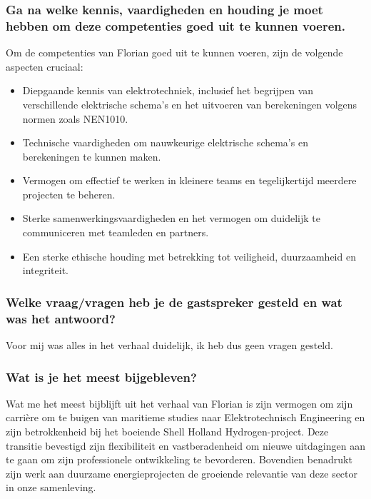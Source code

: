 \subsubsection{Ga na welke kennis, vaardigheden en houding je moet hebben om deze competenties goed uit te kunnen voeren.}
Om de competenties van Florian goed uit te kunnen voeren, zijn de volgende aspecten cruciaal:
\begin{itemize}
    \item Diepgaande kennis van elektrotechniek, inclusief het begrijpen van verschillende elektrische schema's en het uitvoeren van berekeningen volgens normen zoals NEN1010.
    \item Technische vaardigheden om nauwkeurige elektrische schema's en berekeningen te kunnen maken.
    \item Vermogen om effectief te werken in kleinere teams en tegelijkertijd meerdere projecten te beheren.
    \item Sterke samenwerkingsvaardigheden en het vermogen om duidelijk te communiceren met teamleden en partners.
    \item Een sterke ethische houding met betrekking tot veiligheid, duurzaamheid en integriteit.
\end{itemize}

\subsubsection{Welke vraag/vragen heb je de gastspreker gesteld en wat was het antwoord?}
Voor mij was alles in het verhaal duidelijk, ik heb dus geen vragen gesteld.

\subsubsection{Wat is je het meest bijgebleven?}
Wat me het meest bijblijft uit het verhaal van Florian is zijn vermogen om zijn carrière om te buigen van maritieme studies naar Elektrotechnisch Engineering en zijn betrokkenheid bij het boeiende Shell Holland Hydrogen-project. Deze transitie bevestigd zijn flexibiliteit en vastberadenheid om nieuwe uitdagingen aan te gaan om zijn professionele ontwikkeling te bevorderen. Bovendien benadrukt zijn werk aan duurzame energieprojecten de groeiende relevantie van deze sector in onze samenleving.